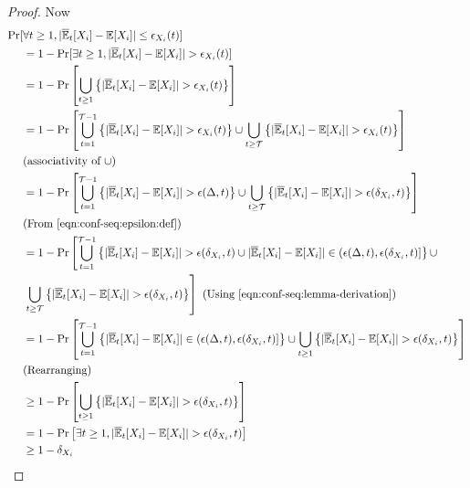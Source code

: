 \begin{proof}
Now
\begin{align*}
    \Pr[&\forall t \geq 1, |\overline{\mathbb{E}}_t[X_i] - \mathbb{E}[X_i]| \leq \epsilon_{X_i}(t)] \\
                           &= 1 -  \Pr[\exists t \geq 1, |\overline{\mathbb{E}}_t[X_i] - \mathbb{E}[X_i]| > \epsilon_{X_i}(t)] \\
                           &= 1 - \Pr\left[\bigcup\limits_{t \geq 1} \left\{|\overline{\mathbb{E}}_t[X_i] - \mathbb{E}[X_i]| > \epsilon_{X_i}(t)\right\}\right] \\
                           &= 1 - \Pr\left[\bigcup\limits_{t = 1}^{{\mathcal{T}}-1} \left\{|\overline{\mathbb{E}}_t[X_i] - \mathbb{E}[X_i]| > \epsilon_{X_i}(t)\right\} \cup \bigcup\limits_{t \geq {\mathcal{T}}} \left\{|\overline{\mathbb{E}}_t[X_i] - \mathbb{E}[X_i]| > \epsilon_{X_i}(t)\right\} \right]\\
                           & \text{(associativity of $\cup$)} \\
                           &= 1 - \Pr\left[\bigcup\limits_{t = 1}^{{\mathcal{T}}-1} \left\{|\overline{\mathbb{E}}_t[X_i] - \mathbb{E}[X_i]| > \epsilon(\Delta, t)\right\} \cup \bigcup\limits_{t \geq {\mathcal{T}}} \left\{|\overline{\mathbb{E}}_t[X_i] - \mathbb{E}[X_i]| > \epsilon(\delta_{X_i}, t)\right\} \right] \\
                           & \text{(From~\ref{eqn:conf-seq:epsilon:def})}\\
                           &= 1 - \Pr\left[\bigcup\limits_{t = 1}^{{\mathcal{T}}-1} \left\{|\overline{\mathbb{E}}_t[X_i] - \mathbb{E}[X_i]| > \epsilon(\delta_{X_i}, t) \cup |\overline{\mathbb{E}}_t[X_i] - \mathbb{E}[X_i]| \in (\epsilon(\Delta, t), \epsilon(\delta_{X_i}, t)] \right\} \cup \right. \\ &\left. \bigcup\limits_{t \geq {\mathcal{T}}} \left\{|\overline{\mathbb{E}}_t[X_i] - \mathbb{E}[X_i]| > \epsilon(\delta_{X_i}, t)\right\} \right] \text{ (Using \ref{eqn:conf-seq:lemma-derivation})} \\
                           &= 1 - \Pr\left[\bigcup\limits_{t = 1}^{{\mathcal{T}}-1} \left\{ |\overline{\mathbb{E}}_t[X_i] - \mathbb{E}[X_i]| \in (\epsilon(\Delta, t), \epsilon(\delta_{X_i}, t)] \right\} \cup  \bigcup\limits_{t \geq 1} \left\{|\overline{\mathbb{E}}_t[X_i] - \mathbb{E}[X_i]| > \epsilon(\delta_{X_i}, t)\right\} \right]\\
                           &\text{(Rearranging)}\\
                           &\geq 1 - \Pr\left[\bigcup\limits_{t \geq 1} \left\{|\overline{\mathbb{E}}_t[X_i] - \mathbb{E}[X_i]| > \epsilon(\delta_{X_i}, t)\right\} \right] \\
                           &= 1 - \Pr\left[ \exists t \geq 1, |\overline{\mathbb{E}}_t[X_i] - \mathbb{E}[X_i]| > \epsilon(\delta_{X_i}, t) \right] \\
                           &\geq 1 - \delta_{X_i}
\end{align*}

\end{proof}
